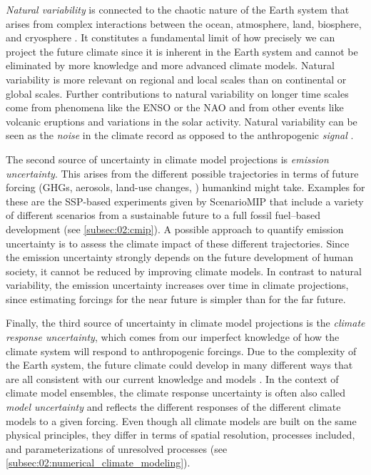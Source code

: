 \emph{Natural variability} is connected to the chaotic nature of the Earth
system that arises from complex interactions between the ocean, atmosphere,
land, biosphere, and cryosphere \autocite{Cubasch2013}. It constitutes a
fundamental limit of how precisely we can project the future climate since it
is inherent in the Earth system and cannot be eliminated by more knowledge and
more advanced climate models. Natural variability is more relevant on regional
and local scales than on continental or global scales. Further contributions to
natural variability on longer time scales come from phenomena like the
\ac{ENSO} or the \ac{NAO} and from other events like volcanic eruptions and
variations in the solar activity. Natural variability can be seen as the
\emph{noise} in the climate record as opposed to the anthropogenic
\emph{signal} \autocite{Cubasch2013}.

The second source of uncertainty in climate model projections is \emph{emission
  uncertainty}. This arises from the different possible trajectories in terms
of future forcing (\acp{GHG}, aerosols, land-use changes, \etc{}) humankind
might take. Examples for these are the \acs{SSP}-based experiments given by
\ac{ScenarioMIP} that include a variety of different scenarios from a
sustainable future to a full fossil fuel--based development (see
\cref{subsec:02:cmip}). A possible approach to quantify emission uncertainty is
to assess the climate impact of these different trajectories. Since the
emission uncertainty strongly depends on the future development of human
society, it cannot be reduced by improving climate models. In contrast to
natural variability, the emission uncertainty increases over time in climate
projections, since estimating forcings for the near future is simpler than for
the far future.

Finally, the third source of uncertainty in climate model projections is the
\emph{climate response uncertainty}, which comes from our imperfect knowledge
of how the climate system will respond to anthropogenic forcings. Due to the
complexity of the Earth system, the future climate could develop in many
different ways that are all consistent with our current knowledge and models
\autocite{Cubasch2013}. In the context of climate model ensembles, the climate
response uncertainty is often also called \emph{model uncertainty} and reflects
the different responses of the different climate models to a given forcing.
Even though all climate models are built on the same physical principles, they
differ in terms of spatial resolution, processes included, and
parameterizations of unresolved processes (see
\cref{subsec:02:numerical_climate_modeling}).

